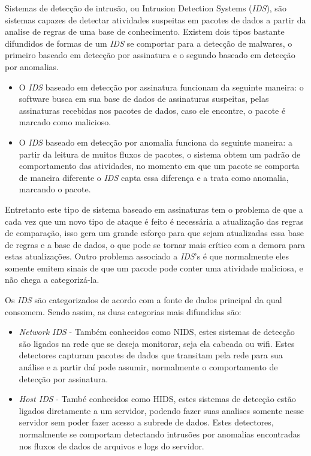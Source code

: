 
Sistemas de detecção de intrusão, ou Intrusion Detection Systems (\textit{IDS}), são sistemas capazes de detectar atividades suspeitas em pacotes de dados a partir da analise de regras de uma base de conhecimento. Existem dois tipos bastante difundidos de formas de um \textit{IDS} se comportar para a detecção de malwares, o primeiro baseado em detecção por assinatura e o segundo baseado em detecção por anomalias.

\begin{itemize}
    \item O \textit{IDS} baseado em detecção por assinatura funcionam da seguinte maneira: o software busca em sua base de dados de assinaturas suspeitas, pelas assinaturas recebidas nos pacotes de dados, caso ele encontre, o pacote é marcado como malicioso. \cite{rehman2003intrusion}
    \item O \textit{IDS} baseado em detecção por anomalia funciona da seguinte maneira: a partir da leitura de muitos fluxos de pacotes, o sistema obtem um padrão de comportamento das atividades, no momento em que um pacote se comporta de maneira diferente o \textit{IDS} capta essa diferença e a trata como anomalia, marcando o pacote. \cite{debar2000introduction}
\end{itemize}


Entretanto este tipo de sistema baseado em assinaturas tem o problema de que a cada vez que um novo tipo de ataque é feito é necessária a atualização das regras de comparação, isso gera um grande esforço para que sejam atualizadas essa base de regras e a base de dados, o que pode se tornar mais crítico com a demora para estas atualizações. Outro problema associado a \textit{IDS}'s é que normalmente eles somente emitem sinais de que um pacode pode conter uma atividade maliciosa, e não chega a categorizá-la.

Os \textit{IDS} são categorizados de acordo com a fonte de dados principal da qual consomem. Sendo assim, as duas categorias mais difundidas são:
\begin{itemize}
    \item \textit{Network IDS} - Também conhecidos como NIDS, estes sistemas de detecção são ligados na rede que se deseja monitorar, seja ela cabeada ou wifi. Estes detectores capturam pacotes de dados que transitam pela rede para sua análise e a partir daí pode assumir, normalmente o comportamento de detecção por assinatura.
    \item \textit{Host IDS} -  També conhecidos como HIDS, estes sistemas de detecção estão ligados diretamente a um servidor, podendo fazer suas analises somente nesse servidor sem poder fazer acesso a subrede de dados. Estes detectores, normalmente se comportam detectando intrusões por anomalias encontradas nos fluxos de dados de arquivos e logs do servidor.
\end{itemize}